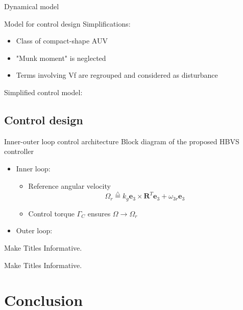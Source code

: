 \documentclass{beamer}
\begin{document}
\begin{frame}{Dynamical model}
\end{frame}

\begin{frame}{Model for control design}
Simplifications:
\begin{itemize}
	\item Class of compact-shape AUV
	\item "Munk moment" is neglected
	\item Terms involving Vf are regrouped and considered as disturbance
\end{itemize}
Simplified control model:


\end{frame}



\subsection{Control design}

\begin{frame}{Inner-outer loop control architecture}
Block diagram of the proposed HBVS controller
\begin{figure}
	
\end{figure}

\begin{itemize}
	\item Inner loop:
	\begin{itemize}
		\item Reference angular velocity $$ \Omega_r \stackrel{\triangle}{=}  k_g \mathbf{e}_3 \times \mathbf{R}^{T} \mathbf{e}_3 + \omega_{3r} \mathbf{e}_3$$
		\item Control torque $\Gamma_C$ ensures  $ \Omega \longrightarrow \Omega_r $ 
	\end{itemize} 
	\item Outer loop:
\end{itemize}
\end{frame}

\begin{frame}{Make Titles Informative.}
\end{frame}

\begin{frame}{Make Titles Informative.}
\end{frame}



\section*{Conclusion}
\end{document}
